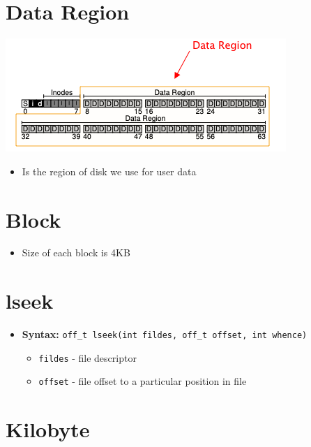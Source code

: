 \documentclass[12pt]{article}
\begin{document}
\section*{Data Region}

\begin{center}
\includegraphics[width=\linewidth]{../images/midterm_2_solution_24.png}
\end{center}

\begin{itemize}
    \item Is the region of disk we use for user data
\end{itemize}


\section{Block}

\begin{itemize}
    \item Size of each block is 4KB
\end{itemize}

\section{lseek}

\begin{itemize}
    \item \textbf{Syntax:} \texttt{off\_t lseek(int fildes, off\_t offset, int whence)}

    \begin{itemize}
        \item \texttt{fildes} - file descriptor
        \item \texttt{offset} - file offset to a particular position in file
    \end{itemize}
\end{itemize}

\section{Kilobyte}
\end{document}
